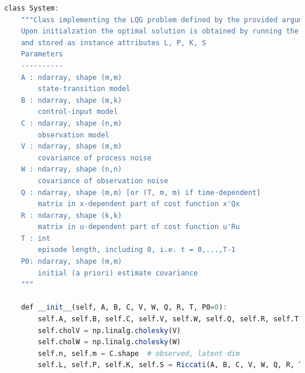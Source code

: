 \begin{lstlisting}[language=julia]
class System:
    """Class implementing the LQG problem defined by the provided arguments
    Upon initialzation the optimal solution is obtained by running the Riccati equations
    and stored as instance attributes L, P, K, S
    Parameters
    ----------
    A : ndarray, shape (m,m)
        state-transition model
    B : ndarray, shape (m,k)
        control-input model
    C : ndarray, shape (n,m)
        observation model
    V : ndarray, shape (m,m)
        covariance of process noise
    W : ndarray, shape (n,n)
        covariance of observation noise
    Q : ndarray, shape (m,m) [or (T, m, m) if time-dependent]
        matrix in x-dependent part of cost function x'Qx
    R : ndarray, shape (k,k)
        matrix in u-dependent part of cost function u'Ru
    T : int
        episode length, including 0, i.e. t = 0,...,T-1
    P0: ndarray, shape (m,m)
        initial (a priori) estimate covariance
    """

    def __init__(self, A, B, C, V, W, Q, R, T, P0=0):
        self.A, self.B, self.C, self.V, self.W, self.Q, self.R, self.T = A, B, C, V, W, Q, R, T
        self.cholV = np.linalg.cholesky(V)
        self.cholW = np.linalg.cholesky(W)
        self.n, self.m = C.shape  # observed, latent dim
        self.L, self.P, self.K, self.S = Riccati(A, B, C, V, W, Q, R, T, P0)


\end{lstlisting}
